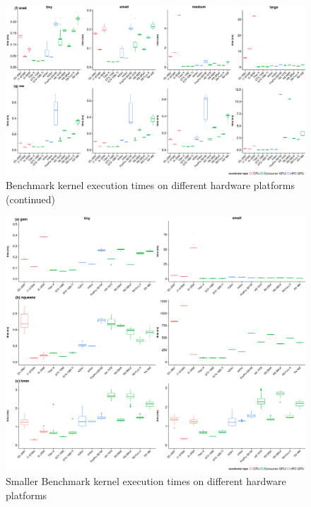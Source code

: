 \documentclass[../document.tex]{subfiles}
\begin{document}
\begin{figure}[t]
    \centering
    \includegraphics[width=\textwidth,keepaspectratio]{figures/new-time-results/generate_main_4x2_bandwplot}
    \caption{Benchmark kernel execution times on different hardware platforms (continued)}
    \label{fig:time2}
\end{figure}

\begin{figure}
    \centering
    \includegraphics[width=\textwidth,keepaspectratio]{figures/new-time-results/generate_main_2x3_bandwplot}
    \caption{Smaller Benchmark kernel execution times on different hardware platforms}
    \label{fig:time3}
\end{figure}
\end{document}
